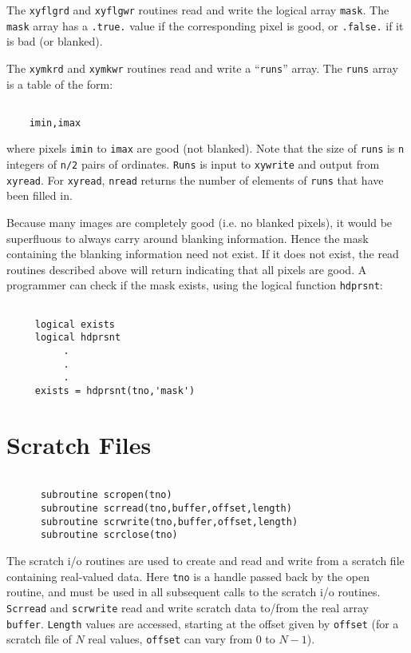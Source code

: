 \documentclass{report}
\begin{document}
The {\tt xyflgrd} and {\tt xyflgwr} routines read and write the logical
array {\tt mask}. The {\tt mask} array has a {\tt .true.} value if the
corresponding pixel is good, or {\tt .false.} if it is bad (or blanked).

The {\tt xymkrd} and {\tt xymkwr} routines read and write a ``{\tt runs}''
array. The {\tt runs} array is a table of the form:
\begin{verbatim}

    imin,imax

\end{verbatim}
where pixels {\tt imin} to {\tt imax} are good (not blanked). Note that
the size of {\tt runs} is {\tt n} integers of {\tt n/2} pairs of
ordinates. {\tt Runs} is input to
{\tt xywrite} and output from {\tt xyread}. For {\tt xyread}, {\tt nread}
returns the number of elements of {\tt runs} that have been filled in.

Because many images are completely good (i.e. no blanked pixels),
it would be superfluous to always carry around blanking information.
Hence the
mask containing the blanking information need not exist. If it does not
exist, the read routines described above will return indicating that all
pixels are good.
A programmer can check if the mask exists, using the logical function
{\tt hdprsnt}:
\begin{verbatim}

     logical exists
     logical hdprsnt
          .
          .
          .
     exists = hdprsnt(tno,'mask')

\end{verbatim}

\section{Scratch Files}
\begin{verbatim}

      subroutine scropen(tno)
      subroutine scrread(tno,buffer,offset,length)
      subroutine scrwrite(tno,buffer,offset,length)
      subroutine scrclose(tno)

\end{verbatim}
The scratch i/o routines are used to create and read and write from a
scratch file containing real-valued data. Here {\tt tno} is a handle passed
back by the open routine,
and must be used in all subsequent calls to the scratch i/o routines.
{\tt Scrread} and {\tt scrwrite} read and write scratch data to/from the
real array {\tt buffer}. {\tt Length} values are accessed, starting
at the offset given by {\tt offset} (for a scratch file of $N$ real
values, {\tt offset} can vary from 0 to $N-1$).
\end{document}
